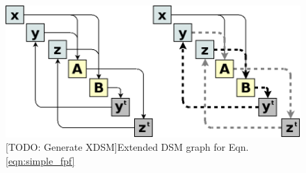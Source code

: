    \begin{figure}[!hbp]
        \begin{center}
        \includegraphics[width=.75\textwidth]{images/dsm_simple}
        \caption{[TODO: Generate XDSM]Extended DSM graph for Eqn. \ref{eqn:simple_fpf} \label{fig:dsm_full}}
        \end{center}
    \end{figure}